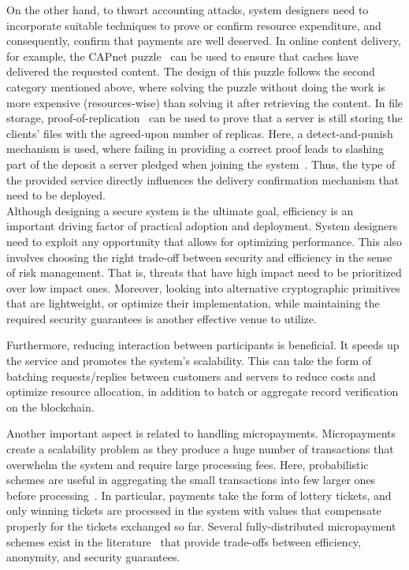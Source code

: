 \documentclass{llncs}
\begin{document}
On the other hand, to thwart accounting attacks, system designers need to incorporate suitable techniques to prove or confirm resource expenditure, and consequently, confirm that payments are well deserved. In online content delivery, for example, the CAPnet puzzle~\cite{Almashaqbeh19b} can be used to ensure that caches have delivered the requested content. The design of this puzzle follows the second category mentioned above, where solving the puzzle without doing the work is more expensive (resources-wise) than solving it after retrieving the content. In file storage, proof-of-replication~\cite{Fisch19} can be used to prove that a server is still storing the clients’ files with the agreed-upon number of replicas. Here, a detect-and-punish mechanism is used, where failing in providing a correct proof leads to slashing part of the deposit a server pledged when joining the system~\cite{filecoin}. Thus, the type of the provided service directly influences the delivery confirmation mechanism that need to be deployed. \\


 Although designing a secure system is the ultimate goal, efficiency is an important driving factor of practical adoption and deployment. System designers need to exploit any opportunity that allows for optimizing performance. This also involves choosing the right trade-off between security and efficiency in the sense of risk management. That is, threats that have high impact need to be prioritized over low impact ones. Moreover, looking into alternative cryptographic primitives that are lightweight, or optimize their implementation, while maintaining the required security guarantees is another effective venue to utilize.


Furthermore, reducing interaction between participants is beneficial. It speeds up the service and promotes the system’s scalability. This can take the form of batching requests/replies between customers and servers to reduce costs and optimize resource allocation, in addition to batch or aggregate record verification on the blockchain.


Another important aspect is related to handling micropayments. Micropayments create a scalability problem as they produce a huge number of transactions that overwhelm the system and require large processing fees. Here, probabilistic schemes are useful in aggregating the small transactions into few larger ones before processing~\cite{Wheeler96,Rivest97}. In particular, payments take the form of lottery tickets, and only winning tickets are processed in the system with values that compensate properly for the tickets exchanged so far. Several fully-distributed micropayment schemes exist in the literature~\cite{Pass15,Chiesa17,Almashaqbeh20} that provide trade-offs between efficiency, anonymity, and security guarantees. \\
\end{document}
